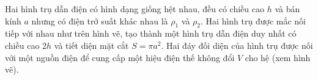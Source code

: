 \begin{vd}
Hai hình trụ dẫn điện có hình dạng giống hệt nhau, đều có chiều cao $h$ và bán kính $a$ nhưng có điện trở suất khác nhau là $\rho_1$ và $\rho_2$. Hai hình trụ được mắc nối tiếp với nhau như trên hình vẽ, tạo thành một hình trụ dẫn điện duy nhất có chiều cao $2h$ và tiết diện mặt cắt $S=\pi a^2$. Hai đáy đối diện của hình trụ được nối với một nguồn điện để cung cấp một hiệu điện thế không đổi $V$ cho hệ (xem hình vẽ).
  \begin{center}

\begin{tikzpicture}[x=0.75pt,y=0.75pt,yscale=-1,xscale=1]


\end{tikzpicture}
\end{center}
\end{vd}

